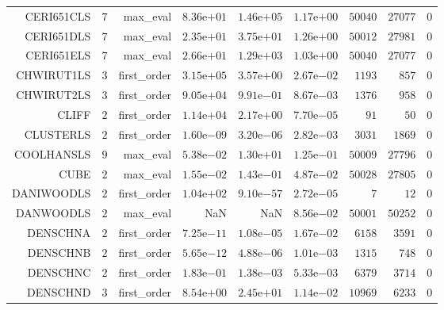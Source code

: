 \begin{longtable}{rrrrrrrrr}
CERI651CLS & \(     7\) & max\_eval & \( 8.36\)e\(+01\) & \( 1.46\)e\(+05\) & \( 1.17\)e\(+00\) & \( 50040\) & \( 27077\) & \(     0\) \\
CERI651DLS & \(     7\) & max\_eval & \( 2.35\)e\(+01\) & \( 3.75\)e\(+01\) & \( 1.26\)e\(+00\) & \( 50012\) & \( 27981\) & \(     0\) \\
CERI651ELS & \(     7\) & max\_eval & \( 2.66\)e\(+01\) & \( 1.29\)e\(+03\) & \( 1.03\)e\(+00\) & \( 50040\) & \( 27077\) & \(     0\) \\
CHWIRUT1LS & \(     3\) & first\_order & \( 3.15\)e\(+05\) & \( 3.57\)e\(+00\) & \( 2.67\)e\(-02\) & \(  1193\) & \(   857\) & \(     0\) \\
CHWIRUT2LS & \(     3\) & first\_order & \( 9.05\)e\(+04\) & \( 9.91\)e\(-01\) & \( 8.67\)e\(-03\) & \(  1376\) & \(   958\) & \(     0\) \\
CLIFF & \(     2\) & first\_order & \( 1.14\)e\(+04\) & \( 2.17\)e\(+00\) & \( 7.70\)e\(-05\) & \(    91\) & \(    50\) & \(     0\) \\
CLUSTERLS & \(     2\) & first\_order & \( 1.60\)e\(-09\) & \( 3.20\)e\(-06\) & \( 2.82\)e\(-03\) & \(  3031\) & \(  1869\) & \(     0\) \\
COOLHANSLS & \(     9\) & max\_eval & \( 5.38\)e\(-02\) & \( 1.30\)e\(+01\) & \( 1.25\)e\(-01\) & \( 50009\) & \( 27796\) & \(     0\) \\
CUBE & \(     2\) & max\_eval & \( 1.55\)e\(-02\) & \( 1.43\)e\(-01\) & \( 4.87\)e\(-02\) & \( 50028\) & \( 27805\) & \(     0\) \\
DANIWOODLS & \(     2\) & first\_order & \( 1.04\)e\(+02\) & \( 9.10\)e\(-57\) & \( 2.72\)e\(-05\) & \(     7\) & \(    12\) & \(     0\) \\
DANWOODLS & \(     2\) & max\_eval &       NaN &       NaN & \( 8.56\)e\(-02\) & \( 50001\) & \( 50252\) & \(     0\) \\
DENSCHNA & \(     2\) & first\_order & \( 7.25\)e\(-11\) & \( 1.08\)e\(-05\) & \( 1.67\)e\(-02\) & \(  6158\) & \(  3591\) & \(     0\) \\
DENSCHNB & \(     2\) & first\_order & \( 5.65\)e\(-12\) & \( 4.88\)e\(-06\) & \( 1.01\)e\(-03\) & \(  1315\) & \(   748\) & \(     0\) \\
DENSCHNC & \(     2\) & first\_order & \( 1.83\)e\(-01\) & \( 1.38\)e\(-03\) & \( 5.33\)e\(-03\) & \(  6379\) & \(  3714\) & \(     0\) \\
DENSCHND & \(     3\) & first\_order & \( 8.54\)e\(+00\) & \( 2.45\)e\(+01\) & \( 1.14\)e\(-02\) & \( 10969\) & \(  6233\) & \(     0\) \\

\end{longtable}

